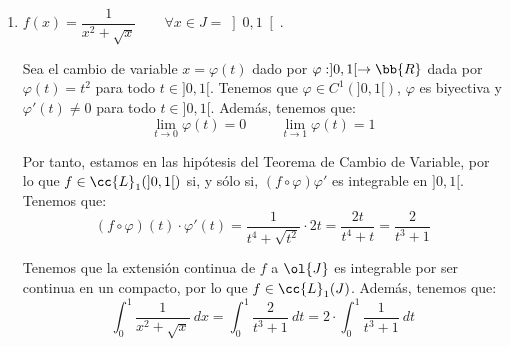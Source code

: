 \begin{ejercicio}
\begin{enumerate}
        Por tanto, estamos en las hipótesis del Teorema de Cambio de Variable, por lo que $f\in \cc{L}_1(\bb{R})$ si, y sólo si, $(f\circ \varphi)\varphi'$ es integrable en $\bb{R}^+$.
        Tenemos que:
        \begin{equation*}
            (f\circ \varphi)(t)\cdot \varphi'(t)
            = \dfrac{1}{e^{\ln t}+e^{-\ln t}}\cdot \dfrac{1}{t}
            = \dfrac{1}{t + \nicefrac{1}{t}}\cdot \dfrac{1}{t}
            = \dfrac{1}{t^2 + 1}
        \end{equation*}

        Por tanto, tenemos que $(f\circ \varphi)\varphi'$ es integrable en $\bb{R}^+$, por lo que $f\in \cc{L}_1(\bb{R})$. Además, tenemos que:
        \begin{equation*}
            \int_{-\infty}^{+\infty} \dfrac{1}{e^x+e^{-x}}~dx
            = \int_0^{+\infty} \dfrac{1}{t^2+1}~dt
            = \left[\arctan t\right]_0^{+\infty}
            = \frac{\pi}{2}
        \end{equation*}


        \item $f(x)=\dfrac{1}{x^2 + \sqrt{x}} \qquad \forall x\in J=\left]0,1\right[$.
        
        Sea el cambio de variable $x=\varphi(t)$ dado por $\varphi:]0,1[\to \bb{R}$ dada por $\varphi(t)=t^2$ para todo $t\in ]0,1[$.
        Tenemos que $\varphi\in C^1(]0,1[)$, $\varphi$ es biyectiva y $\varphi'(t)\neq 0$ para todo $t\in ]0,1[$. Además, tenemos que:
        \begin{equation*}
            \lim_{t\to 0} \varphi(t) = 0 \hspace{1cm} \lim_{t\to 1} \varphi(t) = 1
        \end{equation*}

        Por tanto, estamos en las hipótesis del Teorema de Cambio de Variable, por lo que $f\in \cc{L}_1(]0,1[)$ si, y sólo si, $(f\circ \varphi)\varphi'$ es integrable en $]0,1[$.
        Tenemos que:
        \begin{equation*}
            (f\circ \varphi)(t)\cdot \varphi'(t)
            = \dfrac{1}{t^4 + \sqrt{t^2}}\cdot 2t
            = \dfrac{2t}{t^4 + t}
            = \dfrac{2}{t^3 + 1}
        \end{equation*}

        Tenemos que la extensión continua de $f$ a $\ol{J}$ es integrable por ser continua en un compacto, por lo que $f\in \cc{L}_1(J)$. Además, tenemos que:
        \begin{equation*}
            \int_0^1 \dfrac{1}{x^2 + \sqrt{x}}~dx
            = \int_0^1 \dfrac{2}{t^3 + 1}~dt
            = 2\cdot \int_0^1 \dfrac{1}{t^3 + 1}~dt
        \end{equation*}


\end{enumerate}
\end{ejercicio}
